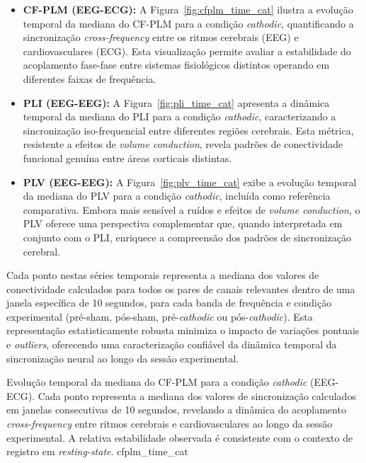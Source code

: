 \begin{itemize}
    \item \textbf{CF-PLM (EEG-ECG):} A Figura~\ref{fig:cfplm_time_cat} ilustra a evolução temporal da mediana do CF-PLM para a condição \textit{cathodic}, quantificando a sincronização \textit{cross-frequency} entre os ritmos cerebrais (EEG) e cardiovasculares (ECG). Esta visualização permite avaliar a estabilidade do acoplamento fase-fase entre sistemas fisiológicos distintos operando em diferentes faixas de frequência.

    \item \textbf{PLI (EEG-EEG):} A Figura~\ref{fig:pli_time_cat} apresenta a dinâmica temporal da mediana do PLI para a condição \textit{cathodic}, caracterizando a sincronização iso-frequencial entre diferentes regiões cerebrais. Esta métrica, resistente a efeitos de \textit{volume conduction}, revela padrões de conectividade funcional genuína entre áreas corticais distintas.

    \item \textbf{PLV (EEG-EEG):} A Figura~\ref{fig:plv_time_cat} exibe a evolução temporal da mediana do PLV para a condição \textit{cathodic}, incluída como referência comparativa. Embora mais sensível a ruídos e efeitos de \textit{volume conduction}, o PLV oferece uma perspectiva complementar que, quando interpretada em conjunto com o PLI, enriquece a compreensão dos padrões de sincronização cerebral.
\end{itemize}

Cada ponto nestas séries temporais representa a mediana dos valores de conectividade calculados para todos os pares de canais relevantes dentro de uma janela específica de 10 segundos, para cada banda de frequência e condição experimental (pré-sham, pós-sham, pré-\textit{cathodic} ou pós-\textit{cathodic}). Esta representação estatisticamente robusta minimiza o impacto de variações pontuais e \textit{outliers}, oferecendo uma caracterização confiável da dinâmica temporal da sincronização neural ao longo da sessão experimental.

{Evolução temporal da mediana do CF-PLM para a condição \textit{cathodic} (EEG-ECG). Cada ponto representa a mediana dos valores de sincronização calculados em janelas consecutivas de 10 segundos, revelando a dinâmica do acoplamento \textit{cross-frequency} entre ritmos cerebrais e cardiovasculares ao longo da sessão experimental. A relativa estabilidade observada é consistente com o contexto de registro em \textit{resting-state}.}
{cfplm_time_cat}

